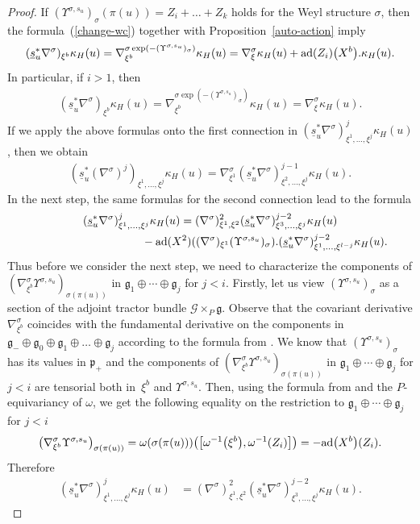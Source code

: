 \documentclass[pdftex]{sigma}
\newcommand{\om}{\omega}
\newcommand{\ka}{\kappa}
\newcommand{\si}{\sigma}
\newcommand{\un}{\underline}
\newcommand{\ba}{\mathcal{G}}
\newcommand{\fg}{\mathfrak g}
\newcommand{\fp}{\mathfrak p}
\newcommand{\na}{\nabla}
\newcommand{\U}{\Upsilon}
\newcommand{\ad}{{\rm ad}}
\numberwithin{equation}{section}
\begin{document}
\begin{proof}
If $(\U^{\si,s_u})_\si(\pi(u))=Z_i+\dots+Z_k$ holds for the Weyl structure $\si$, then the formula~(\ref{change-wc}) together with Proposition~\ref{auto-action} imply
\begin{gather*}(\un s_u^*\na^\si)_{\xi^b}\ka_H(u)=\na^{\si \exp(-(\U^{\si,s_u})_\si)}_{\xi^b}\ka_H(u)=\na^\si_\xi \ka_H(u)+\ad(Z_i)\big(X^{b}\big).\ka_H(u).\end{gather*}
In particular, if $i>1$, then
\begin{gather*}(\un s_u^*\na^\si)_{\xi^b}\ka_H(u)=\na^{\si \exp(-(\U^{\si,s_u})_\si)}_{\xi^b}\ka_H(u)=\na^\si_\xi \ka_H(u).\end{gather*}
If we apply the above formulas onto the f\/irst connection in $(\un s_u^*\nabla^\si)^j_{\xi^1,\dots,\xi^j} \ka_H(u)$, then we obtain
\begin{gather*}
(\un s_u^*(\nabla^\si)^j)_{\xi^1,\dots,\xi^j} \ka_H(u) =\na^\si_{\xi^1}(\un s_u^*\nabla^\si)^{j-1}_{\xi^2,\dots,\xi^{j}} \ka_H(u).
\end{gather*}
In the next step, the same formulas for the second connection lead to the formula
\begin{gather*}
(\un s_u^*\nabla^\si)^j_{\xi^1,\dots,\xi^j} \ka_H(u) =(\na^\si)^2_{\xi^1,\xi^2}(\un s_u^*\nabla^\si)^{j-2}_{\xi^3,\dots,\xi^{j}} \ka_H(u)\\
\hphantom{(\un s_u^*\nabla^\si)^j_{\xi^1,\dots,\xi^j} \ka_H(u) =}{}
-\ad(X^{2})((\nabla^\si)_{\xi^1}(\U^{\si,s_u})_\si).(\un s_u^*\nabla^\si)^{j-2}_{\xi^1,\dots,\xi^{l-j}}\ka_H(u).
\end{gather*}
Thus before we consider the next step, we need to characterize the components of $(\na^\si_{\xi^b}\! \U^{\si,s_u}\!)_{\si(\pi(u))\!}\!$ in $\fg_1\oplus \cdots \oplus \fg_{j}$ for $j<i$. Firstly, let us view $(\U^{\si,s_u})_\si$ as a section of the adjoint tractor bundle $\ba\times_P \fg$. Observe that the covariant derivative $\na^\si_{\xi^b}$ coincides with the fundamental derivative on the components in $\fg_-\oplus \fg_0 \oplus \fg_1\oplus \dots \oplus \fg_j$ according to the formula from \cite[Proposition~5.1.10]{parabook}. We know that $(\U^{\si,s_u})_\si$ has its values in $\fp_+$ and the components of $(\na^\si_{\xi^b} \U^{\si,s_u})_{\si(\pi(u))}$ in $\fg_1\oplus \cdots \oplus \fg_{j}$ for $j<i$ are tensorial both in~$\xi^b$ and $\U^{\si,s_u}$. Then, using the formula from \cite[Corollary~1.5.8]{parabook} and the $P$-equivariancy of $\om$, we get the following equality on the restriction to $\fg_1\oplus \cdots \oplus \fg_j$ for $j<i$
\begin{gather*}
\big(\na^\si_{\xi^b} \U^{\si,s_u}\big)_{\si(\pi(u))} =\om(\si(\pi(u)))\big(\big[\om^{-1}\big(\xi^b\big),\om^{-1}(Z_i)\big]\big)=-\ad\big(X^b\big)(Z_i).
\end{gather*}
Therefore
\begin{align*}
(\un s_u^*\nabla^\si)^j_{\xi^1,\dots,\xi^j} \ka_H(u)&=(\na^\si)^2_{\xi^1,\xi^2}(\un s_u^*\nabla^\si)^{j-2}_{\xi^3,\dots,\xi^{j}} \ka_H(u).
\end{align*}


\end{proof}
\end{document}
